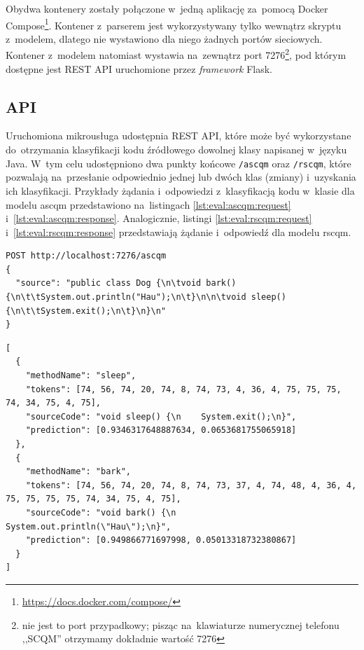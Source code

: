\documentclass[twoside]{praca}
\begin{document}
Obydwa kontenery zostały połączone w~jedną aplikację za~pomocą Docker Compose\footnote{\url{https://docs.docker.com/compose/}}. Kontener z~parserem jest wykorzystywany tylko wewnątrz skryptu z~modelem, dlatego nie wystawiono dla niego żadnych portów sieciowych. Kontener z~modelem natomiast wystawia na~zewnątrz port 7276\footnote{nie jest to port przypadkowy; pisząc na~klawiaturze numerycznej telefonu ,,SCQM'' otrzymamy dokładnie wartość 7276}, pod którym dostępne jest REST API uruchomione przez \textit{framework} Flask.

\subsection{API}

Uruchomiona mikrousługa udostępnia REST API, które może być wykorzystane do~otrzymania klasyfikacji kodu źródłowego dowolnej klasy napisanej w~języku Java. W~tym celu udostępniono dwa punkty końcowe \texttt{/ascqm} oraz \texttt{/rscqm}, które pozwalają na~przesłanie odpowiednio jednej lub dwóch klas (zmiany) i~uzyskania ich klasyfikacji. Przykłady żądania i~odpowiedzi z~klasyfikacją kodu w~klasie dla modelu \gls{ascqm} przedstawiono na~listingach \ref{lst:eval:ascqm:request} i~\ref{lst:eval:ascqm:response}. Analogicznie, listingi \ref{lst:eval:rscqm:request} i~\ref{lst:eval:rscqm:response} przedstawiają żądanie i~odpowiedź dla modelu \gls{rscqm}.

\pagebreak

\begin{lstlisting}[frame=single,caption={Przykład poprawnego żądania do~REST API modelu aSCQM},captionpos=b,label={lst:eval:ascqm:request}]
POST http://localhost:7276/ascqm
{
  "source": "public class Dog {\n\tvoid bark() {\n\t\tSystem.out.println("Hau");\n\t}\n\n\tvoid sleep() {\n\t\tSystem.exit();\n\t}\n}\n"
}
\end{lstlisting}

\begin{lstlisting}[frame=single,caption={Przykład odpowiedzi z~predykcją dla modelu aSCQM},captionpos=b,label={lst:eval:ascqm:response}]
[
  {
    "methodName": "sleep", 
    "tokens": [74, 56, 74, 20, 74, 8, 74, 73, 4, 36, 4, 75, 75, 75, 74, 34, 75, 4, 75],
    "sourceCode": "void sleep() {\n    System.exit();\n}", 
    "prediction": [0.9346317648887634, 0.0653681755065918]
  }, 
  {
    "methodName": "bark", 
    "tokens": [74, 56, 74, 20, 74, 8, 74, 73, 37, 4, 74, 48, 4, 36, 4, 75, 75, 75, 75, 74, 34, 75, 4, 75],
    "sourceCode": "void bark() {\n    System.out.println(\"Hau\");\n}", 
    "prediction": [0.949866771697998, 0.05013318732380867]
  }
]
\end{lstlisting}
\end{document}
